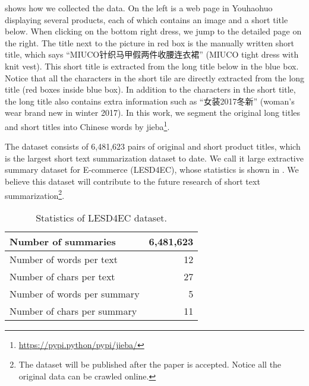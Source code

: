  shows how we collected the data.
On the left is a web page in Youhaohuo displaying several products, 
each of which contains an image and a short title below. 
When clicking on the bottom right dress, we jump to the detailed page 
on the right.  The title next to the picture in red box is the manually 
written short title, which says ``MIUCO针织马甲假两件收腰连衣裙'' (MIUCO tight dress with knit vest).
This short title is extracted from the long title below in the blue box. 
Notice that all the characters in the short tile are directly extracted from 
the long title (red boxes inside blue box). 
In addition to the characters in the short title, the long title also 
contains extra information such as ``女装2017冬新'' (woman's wear brand new
in winter 2017). In this work, we segment the original long titles and 
short titles into Chinese words by jieba\footnote{\url{https://pypi.python/pypi/jieba/}}.


The dataset consists of 6,481,623 pairs of original and short product titles, 
which is the largest short text summarization dataset to date.
We call it large extractive summary dataset for E-commerce (LESD4EC),
whose statistics is shown in .
We believe this dataset will contribute to the future research of
short text summarization\footnote{The dataset will be published after
the paper is accepted. Notice all the original data can be crawled online.}.

\begin{table}[th]
	\centering
	\caption{Statistics of LESD4EC dataset.}
	\label{tab:data}
	\begin{tabular}{l|r}
		\toprule
		Number of summaries & 6,481,623 \\%
		\midrule
		Number of words per text  & 12 \\ %
		\midrule
		Number of chars per text & 27  \\ %
		\midrule
		Number of words per summary & 5  \\ %
		\midrule
		Number of chars per summary & 11  \\ %
		\bottomrule
	\end{tabular}
\end{table}

